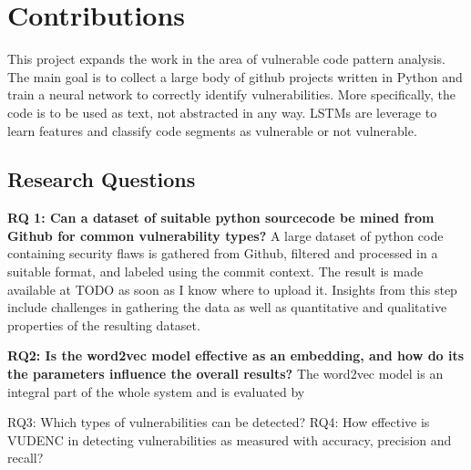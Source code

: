 \documentclass[
	a4paper,
	pagesize,
	pdftex,
	12pt,
	twoside, %
	BCOR=5mm, %
	ngerman,
	fleqn,
	final,
	]{scrartcl}
\begin{document}
\section{Contributions}

This project expands the work in the area of vulnerable code pattern analysis. The main goal is to collect a large body of github projects written in Python and train a neural network to correctly identify vulnerabilities. More specifically, the code is to be used as text, not abstracted in any way. LSTMs are leverage to learn features and classify code segments as vulnerable or not vulnerable. 

\subsection{Research Questions}

\textbf{RQ 1: Can a dataset of suitable python sourcecode be mined from Github for common vulnerability types?}
A large dataset of python code containing security flaws is gathered from Github, filtered and processed in a suitable format, and labeled using the commit context. The result is made available at TODO as soon as I know where to upload it. Insights from this step include challenges in gathering the data as well as quantitative and qualitative properties of the resulting dataset.

\textbf{RQ2: Is the word2vec model effective as an embedding, and how do its the parameters influence the overall results?}
The word2vec model is an integral part of the whole system and is evaluated by 


 RQ3: Which types of vulnerabilities can be detected? RQ4: How effective is VUDENC in detecting vulnerabilities as measured with accuracy, precision and recall? 




\end{document}
